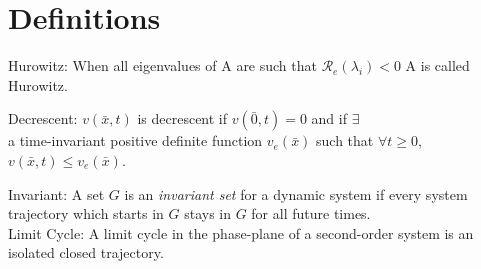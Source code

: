 \documentclass[12pt]{article}
\begin{document}
\section*{Definitions}

Hurowitz: When all eigenvalues of A are such that $\mathcal{R}_e(\lambda_i)<0$ A is called Hurowitz. 

Decrescent: $v(\bar{x},t)$ is decrescent if $v(\bar{0},t)=0$ and if $\exists$ \\ a time-invariant positive definite function $v_e(\bar{x})$ such that $\forall t\geq0$, $v(\bar{x},t)\leq v_e(\bar{x})$.

Invariant: A set $G$ is an {\em invariant set} for a dynamic system if every system trajectory which starts in $G$ stays in $G$ for all future times. \\

Limit Cycle: A limit cycle in the phase-plane of a second-order system is an isolated closed trajectory. 
\end{document}
